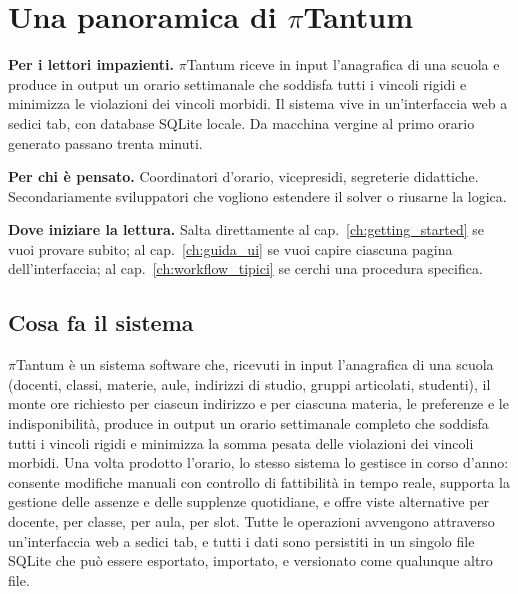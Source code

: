 \chapter{Una panoramica di $\pi$Tantum}
\label{ch:panoramica_pitantum}


\begin{ideabox}
\textbf{Per i lettori impazienti.} $\pi$Tantum riceve in
input l'anagrafica di una scuola e produce in output un
orario settimanale che soddisfa tutti i vincoli rigidi e
minimizza le violazioni dei vincoli morbidi. Il sistema
vive in un'interfaccia web a sedici tab, con database
SQLite locale. Da macchina vergine al primo orario
generato passano trenta minuti.

\medskip
\noindent\textbf{Per chi \`e pensato.} Coordinatori
d'orario, vicepresidi, segreterie didattiche.
Secondariamente sviluppatori che vogliono estendere il
solver o riusarne la logica.

\medskip
\noindent\textbf{Dove iniziare la lettura.} Salta
direttamente al cap.~\ref{ch:getting_started} se vuoi
provare subito; al cap.~\ref{ch:guida_ui} se vuoi capire
ciascuna pagina dell'interfaccia; al
cap.~\ref{ch:workflow_tipici} se cerchi una procedura
specifica.
\end{ideabox}

\section{Cosa fa il sistema}

$\pi$Tantum \`e un sistema software che, ricevuti in input
l'anagrafica di una scuola (docenti, classi, materie, aule,
indirizzi di studio, gruppi articolati, studenti), il monte
ore richiesto per ciascun indirizzo e per ciascuna materia,
le preferenze e le indisponibilit\`a, produce in output un
orario settimanale completo che soddisfa tutti i vincoli
rigidi e minimizza la somma pesata delle violazioni dei
vincoli morbidi. Una volta prodotto l'orario, lo stesso
sistema lo gestisce in corso d'anno: consente modifiche
manuali con controllo di fattibilit\`a in tempo reale,
supporta la gestione delle assenze e delle supplenze
quotidiane, e offre viste alternative per docente, per
classe, per aula, per slot. Tutte le operazioni avvengono
attraverso un'interfaccia web a sedici tab, e tutti i dati
sono persistiti in un singolo file SQLite che pu\`o essere
esportato, importato, e versionato come qualunque altro file.

